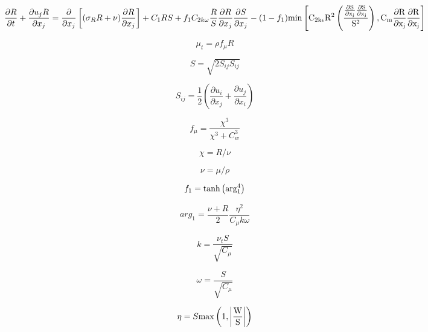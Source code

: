 

\begin{equation}
\frac{\partial R}{\partial t} + \frac{\partial u_j R}{\partial x_j}
= \frac{\partial}{\partial x_j} \left[(\sigma_R R + \nu) \frac{\partial R}{\partial x_j} \right]
+C_1RS + f_1 C_{2k\omega} \frac{R}{S} \frac{\partial R}{\partial x_j} \frac{\partial S}{\partial x_j}
-(1-f_1)\rm{min} \left[ 
C_{2k\epsilon}R^2 \left(\frac{\frac{\partial S}{\partial x_j} \frac{\partial S}{\partial x_j}}{S^2} \right),
C_m\frac{\partial R}{\partial x_j}\frac{\partial R}{\partial x_j} \right]
\end{equation}

\begin{equation}
\mu_t = \rho f_{\mu} R
\end{equation}

\begin{equation}
S=\sqrt{2 S_{ij} S_{ij} }
\end{equation}

\begin{equation}
S_{ij} = \frac{1}{2} \left( \frac{\partial u_i}{\partial x_j} +
\frac{\partial u_j}{\partial x_i} \right)
\end{equation}

\begin{equation}
f_{\mu} = \frac{\chi^3}{\chi^3 + C_w^3}
\end{equation}

\begin{equation}
\chi = R/ \nu
\end{equation}

\begin{equation}
\nu = \mu/ \rho
\end{equation}

\begin{equation}
f_1 = \rm{tanh} \left(arg_1^4 \right)
\end{equation}

\begin{equation}
arg_1 = \frac{\nu + R}{2} \frac{\eta^2}{C_{\mu} k \omega}
\end{equation}

\begin{equation}
k = \frac{\nu_t S}{\sqrt{C_{\mu}}}
\end{equation}

\begin{equation}
\omega = \frac{S}{\sqrt{C_{\mu}}}
\end{equation}

\begin{equation}
\eta = S \rm{max} \left( 1, \left| \frac{W}{S}\right| \right)
\end{equation}

